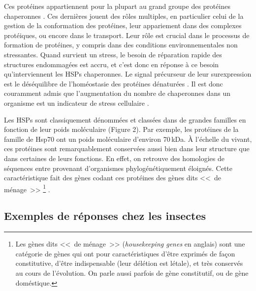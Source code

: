 	Ces protéines appartiennent pour la plupart au grand groupe des protéines chaperonnes \cite{federhoffmann1999}.
	Ces dernières jouent des rôles multiples, en particulier celui de la gestion de la conformation des protéines, leur appariement dans des complexes protéiques, ou encore dans le transport.
	Leur rôle est crucial dans le processus de formation de protéines, y compris dans des conditions environnementales non stressantes.
	Quand survient un stress, le besoin de réparation rapide des structures endommagées est accru, et c'est donc en réponse à ce besoin qu'interviennent les HSPs chaperonnes.
	Le signal précurseur de leur surexpression est le déséquilibre de l'homéostasie des protéines dénaturées \cite{ananthan1986}.
	Il est donc couramment admis que l'augmentation du nombre de chaperonnes dans un organisme est un indicateur de stress cellulaire \cite{ryan1996}.

	Les HSPs sont classiquement dénommées et classées dans de grandes familles en fonction de leur poids moléculaire (Figure 2).
	Par exemple, les protéines de la famille de Hsp70 ont un poids moléculaire d'environ 70\,kDa.
	À l'échelle du vivant, ces protéines sont remarquablement conservées aussi bien dans leur structure que dans certaines de leurs fonctions.
	En effet, on retrouve des homologies de séquences entre provenant d’organismes phylogénétiquement éloignés.
	Cette caractéristique fait des gènes codant ces protéines des gènes dits <<~de ménage~>>%
\footnote{Les gènes dits <<~de ménage~>> (\textit{housekeeping genes} en anglais) sont une catégorie de gènes qui ont pour caractéristiques d'être exprimés de façon constitutive, d'être indispensable (leur délétion est létale), et très conservés au cours de l'évolution. On parle aussi parfois de gène constitutif, ou de gène doméstique.} \cite{gupta1995}.



	\subsection{Exemples de réponses chez les insectes}

